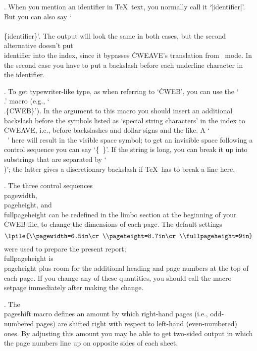 {{{{{{. When you mention an identifier in \TeX\ text, you normally call
it `\.{|identifier|}'. But you can also say `\.{\\\\\{identifier\}}'. The
output will look the same in both cases, but the second alternative
doesn't put \\{identifier} into the index, since
it bypasses \.{CWEAVE}'s translation from \Cee\ mode. In the second
case you have to put a backslash before each underline character
in the identifier.

. To get typewriter-like type, as when referring to `\.{CWEB}', you
can use the `\.{\\.}' macro (e.g., `\.{\\.\{CWEB\}}'). In the argument to
this macro you should insert an additional backslash before the symbols
listed as `special string characters' in the index to \.{CWEAVE}, i.e.,
before backslashes and dollar signs and the like.
A `\.{\\\ }' here will result in the visible space symbol; to get an
invisible space following a control sequence you can say `\.{\{\ \}}'.
If the string is long, you can break it up into substrings that
are separated by `\.{\\)}'; the latter gives a discretionary backslash
if \TeX\ has to break a line here.

. The three control sequences \.{\\pagewidth}, \.{\\pageheight},
and \.{\\fullpageheight} can be redefined in the limbo section at the
beginning of your \.{CWEB} file, to change the dimensions of each page.
The default settings
$$\lpile{\\pagewidth=6.5in\cr \\pageheight=8.7in\cr \\fullpageheight=9in}$$
were used to prepare the present report; \.{\\fullpageheight} is
\.{\\pageheight} plus room for the additional heading and page numbers at
the top of each page. If you change any of these quantities, you should
call the macro \.{\\setpage} immediately after making the change.

. The \.{\\pageshift} macro defines an amount by which right-hand
pages (i.e., odd-numbered pages) are shifted right with respect to
left-hand (even-numbered) ones. By adjusting this amount you may be
able to get two-sided output in which the page numbers line up on
opposite sides of each sheet.

}}}}}}
